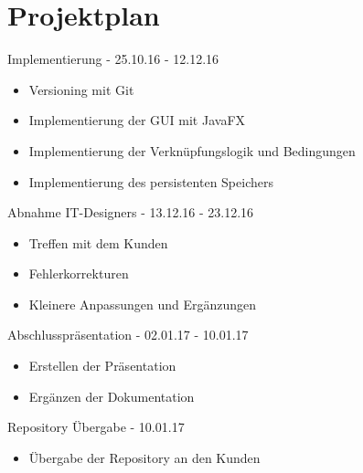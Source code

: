 
\section{Projektplan} %
\begin{description}
\item[Implementierung - 25.10.16 - 12.12.16] 
\end{description}
\begin{itemize}
\item Versioning mit Git
\item Implementierung der GUI mit JavaFX
\item Implementierung der Verknüpfungslogik und Bedingungen
\item Implementierung des persistenten Speichers
\end{itemize}

\begin{description}
\item[Abnahme IT-Designers - 13.12.16 - 23.12.16] 
\end{description}
\begin{itemize}
\item Treffen mit dem Kunden
\item Fehlerkorrekturen
\item Kleinere Anpassungen und Ergänzungen
\end{itemize}

\begin{description}
\item[Abschlusspräsentation - 02.01.17 - 10.01.17] 
\end{description}
\begin{itemize}
\item Erstellen der Präsentation
\item Ergänzen der Dokumentation
\end{itemize}

\begin{description}
\item[Repository Übergabe - 10.01.17] 
\end{description}
\begin{itemize}
\item Übergabe der Repository an den Kunden
\end{itemize}